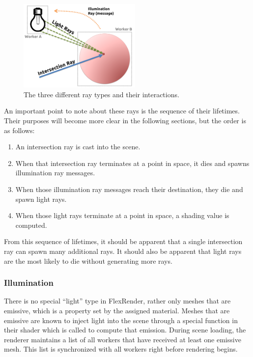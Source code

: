\documentclass[a4paper,twoside]{article}
\begin{document}
\begin{figure}[h!]
    \centering
    \includegraphics[width=60mm]{figures/raytypes.png}
    \caption{The three different ray types and their interactions.}
    \label{fig:raytypes}
\end{figure}

An important point to note about these rays is the sequence of their lifetimes.
Their purposes will become more clear in the following sections, but the order
is as follows:

\begin{enumerate}
   \item An intersection ray is cast into the scene.
   \item When that intersection ray terminates at a point in space, it dies and
      spawns illumination ray messages.
   \item When those illumination ray messages reach their destination, they die and
      spawn light rays.
   \item When those light rays terminate at a point in space, a shading value
      is computed.
\end{enumerate}

From this sequence of lifetimes, it should be apparent that a single intersection
ray can spawn many additional rays. It should also be apparent that light rays
are the most likely to die without generating more rays.

\subsubsection{Illumination}
\label{illumination}

There is no special ``light'' type in FlexRender, rather only meshes that are
emissive, which is a property set by the assigned material. Meshes that are
emissive are known to inject light into the scene through a special function in
their shader which is called to compute that emission. During scene loading,
the renderer maintains a list of all workers that have received at least one
emissive mesh. This list is synchronized with all workers right before
rendering begins.
\end{document}
